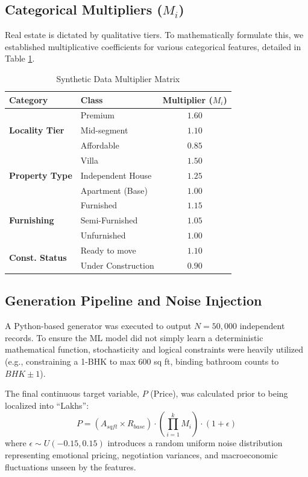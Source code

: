 \documentclass[conference]{IEEEtran}
\begin{document}
\subsection{Categorical Multipliers ($M_i$)}
Real estate is dictated by qualitative tiers. To mathematically formulate this, we established multiplicative coefficients for various categorical features, detailed in Table \ref{tab:multipliers}.

\begin{table}[htbp]
\centering
\caption{Synthetic Data Multiplier Matrix}
\begin{tabular}{@{}llc@{}}
\toprule
\textbf{Category} & \textbf{Class} & \textbf{Multiplier ($M_i$)} \\ \midrule
\multirow{3}{*}{\textbf{Locality Tier}} & Premium & $1.60$ \\
 & Mid-segment & $1.10$ \\
 & Affordable & $0.85$ \\ \midrule
\multirow{3}{*}{\textbf{Property Type}} & Villa & $1.50$ \\
 & Independent House & $1.25$ \\
 & Apartment (Base) & $1.00$ \\ \midrule
\multirow{3}{*}{\textbf{Furnishing}} & Furnished & $1.15$ \\
 & Semi-Furnished & $1.05$ \\
 & Unfurnished & $1.00$ \\ \midrule
\multirow{2}{*}{\textbf{Const. Status}} & Ready to move & $1.10$ \\
 & Under Construction & $0.90$ \\ \bottomrule
\end{tabular}
\label{tab:multipliers}
\end{table}

\subsection{Generation Pipeline and Noise Injection}
A Python-based generator was executed to output $N = 50,000$ independent records. To ensure the ML model did not simply learn a deterministic mathematical function, stochasticity and logical constraints were heavily utilized (e.g., constraining a 1-BHK to max $600$ sq ft, binding bathroom counts to $BHK \pm 1$).

The final continuous target variable, $P$ (Price), was calculated prior to being localized into ``Lakhs'':
\begin{equation}
P = \left( A_{sqft} \times R_{base} \right) \cdot \left( \prod_{i=1}^{k} M_i \right) \cdot (1 + \epsilon)
\label{eq:price}
\end{equation}
where $\epsilon \sim U(-0.15, 0.15)$ introduces a random uniform noise distribution representing emotional pricing, negotiation variances, and macroeconomic fluctuations unseen by the features.
\end{document}
